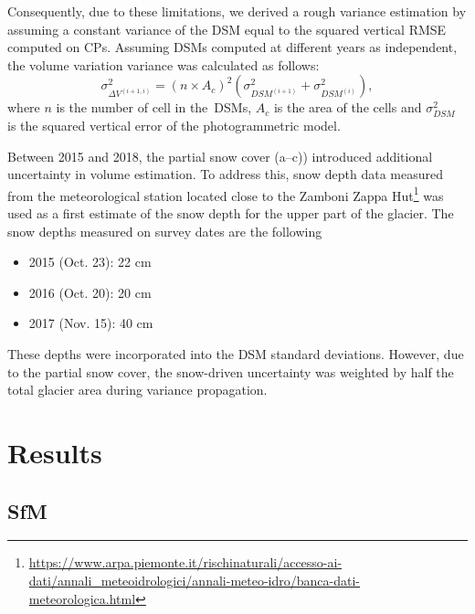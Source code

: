 Consequently, due to these limitations, we derived a rough variance estimation by
assuming a constant variance of the DSM equal to the squared vertical RMSE computed on CPs.
Assuming DSMs computed at different years as independent, the volume variation variance 
was calculated as follows:
\begin{equation}
    \sigma^2_{\Delta V^{(i+1,i)}}  = {(n \times A_c)}^2 \left( \sigma^2
    _{DSM^{(i+1)}} + \sigma^2_{DSM^{(i)}} \right),
    \label{eq:3:volVarProp}
\end{equation}
where $ n $ is the number of cell in the~DSMs, $A_c$ is the area of the cells
and $ \sigma^2 _{DSM}$ is the squared vertical error of the photogrammetric model.

Between 2015 and 2018, the partial snow cover (a--c)) introduced
additional uncertainty in volume estimation. 
To address this, snow depth data measured from the meteorological station located close 
to the Zamboni Zappa 
Hut\footnote{\url{https://www.arpa.piemonte.it/rischinaturali/accesso-ai-dati/annali_meteoidrologici/annali-meteo-idro/banca-dati-meteorologica.html}}
was used as a first estimate of the snow depth for the upper part of the glacier. 
The snow depths measured on survey dates are the following
\begin{itemize}
    \item 2015 (Oct. 23): 22 cm
    \item 2016 (Oct. 20): 20 cm
    \item 2017 (Nov. 15): 40 cm
\end{itemize}
These depths were incorporated into the DSM standard deviations. 
However, due to the partial snow cover, the snow-driven uncertainty was weighted 
by half the total glacier area during variance propagation.

\section{Results}\label{sec:3:res}

\subsection{SfM}\label{sec:3:res:sfm}


